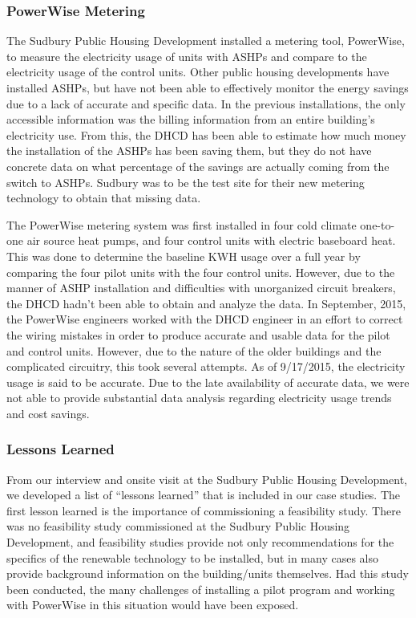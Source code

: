 \subsubsection{PowerWise Metering}
\par The Sudbury Public Housing Development installed a metering tool, PowerWise, to measure the electricity usage of units with ASHPs and compare to the electricity usage of the control units. Other public housing developments have installed ASHPs, but have not been able to effectively monitor the energy savings due to a lack of accurate and specific data. In the previous installations, the only accessible information was the billing information from an entire building’s electricity use. From this, the DHCD has been able to estimate how much money the installation of the ASHPs has been saving them, but they do not have concrete data on what percentage of the savings are actually coming from the switch to ASHPs. Sudbury was to be the test site for their new metering technology to obtain that missing data.
\par The PowerWise metering system was first installed in four cold climate one-to-one air source heat pumps, and four control units with electric baseboard heat. This was done to determine the baseline KWH usage over a full year by comparing the four pilot units with the four control units. However, due to the manner of ASHP installation and difficulties with unorganized circuit breakers, the DHCD hadn’t been able to obtain and analyze the data.  In September, 2015, the PowerWise engineers worked with the DHCD engineer in an effort to correct the wiring mistakes in order to produce accurate and usable data for the pilot and control units. However, due to the nature of the older buildings and the complicated circuitry, this took several attempts. As of 9/17/2015, the electricity usage is said to be accurate. Due to the late availability of accurate data, we were not able to provide substantial data analysis regarding electricity usage trends and cost savings.

\subsubsection{Lessons Learned}
\par From our interview and onsite visit at the Sudbury Public Housing Development, we developed a list of “lessons learned” that is included in our case studies. The first lesson learned is the importance of commissioning a feasibility study. There was no feasibility study commissioned at the Sudbury Public Housing Development, and feasibility studies provide not only recommendations for the specifics of the renewable technology to be installed, but in many cases also provide background information on the building/units themselves. Had this study been conducted, the many challenges of installing a pilot program and working with PowerWise in this situation would have been exposed.

